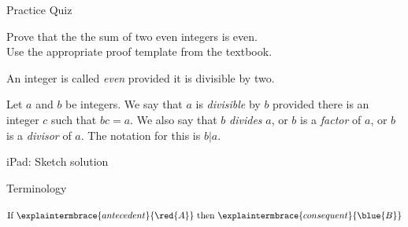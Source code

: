\documentclass[10pt]{beamer}
\begin{document}
\begin{frame}{Practice Quiz}

\vfill 

 \begin{quiz}[title=Practice Quiz Question]
Prove that the the sum of two even integers is even.\\
Use the appropriate proof template from the textbook. 
\end{quiz}


\vfill \vfill 


\begin{mydef}[title=Scheinerman Definition 3.1 (\textbf{Even})]
An integer is called \textit{even} provided it is divisible by two.
\end{mydef}


\begin{mydef}[title=Scheinerman Definition 3.2 (\textbf{Divisible})]
Let $a$ and $b$ be integers.  We say that $a$ is \textit{divisible} by $b$ provided there is an integer $c$ such that $bc=a$.  We also say that $b$ \textit{divides} $a$, or $b$ is a \textit{factor} of $a$, or $b$ is a \textit{divisor} of $a$.  The notation for this is $b|a$. 
\end{mydef}


\end{frame}

\begin{frame}[standout]
iPad: Sketch solution
\end{frame}


\begin{frame}{Terminology}
\vfill
\begin{center}
{\Huge
$\text{If } \explaintermbrace{antecedent}{\red{A}} \text{ then } \explaintermbrace{consequent}{\blue{B}}$
}
\end{center}
\vfill
\end{frame}
\end{document}
